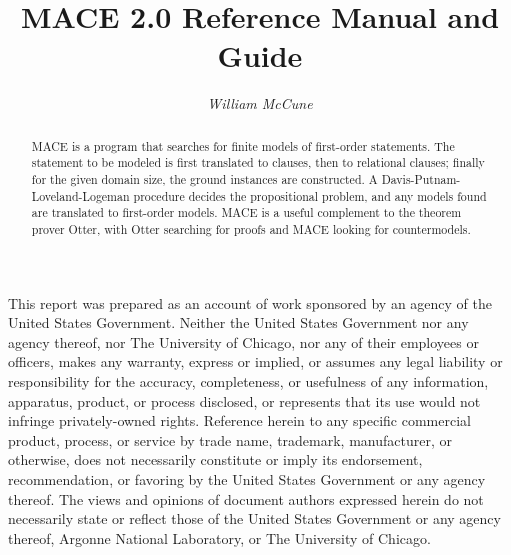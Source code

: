 \documentclass[11pt]{article}
\begin{document}
\noindent
This
report was prepared as an account of work sponsored by an agency of the United States Government.  Neither the United States
Government nor any agency thereof, nor The University of Chicago, nor any of
their employees or officers, makes any warranty, express or implied, or assumes any legal liability or
responsibility for the accuracy, completeness, or usefulness of any
information, apparatus, product, or process disclosed, or represents that its use
would not infringe privately-owned rights.
Reference herein to any specific commercial product, process, or service by trade name,
trademark, manufacturer, or otherwise, does not necessarily constitute
or imply its endorsement, recommendation, or favoring by the United
States Government or any agency thereof.  The views and opinions of document
authors expressed herein do not necessarily state or reflect those of the
United States Government or any agency thereof, Argonne National
Laboratory, or The University of Chicago.
\newpage
  \pagestyle{plain}
  \tableofcontents
\newpage


\setcounter{page}{1}
\title{MACE 2.0 Reference Manual and Guide}

\author{\emph{William McCune}}

% 

\date{}

\maketitle

\begin{abstract}
MACE is a program that searches for finite models
of first-order statements.  The statement to be modeled is
first translated to clauses, then to relational
clauses; finally for the given domain size, the ground
instances are constructed.  A Davis-Putnam-Loveland-Logeman
procedure decides the propositional problem, and any models found
are translated to first-order models.
MACE is a useful complement to the theorem prover Otter,
with Otter searching for proofs and MACE looking for
countermodels.
\end{abstract}
\end{document}
